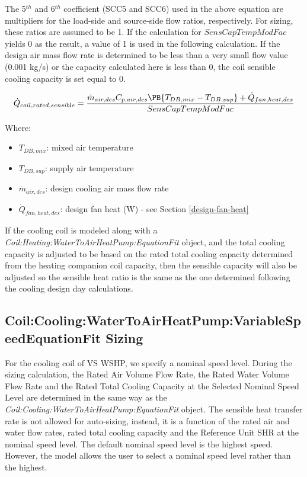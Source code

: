 The 5\(^{th}\) and 6\(^{th}\) coefficient (SCC5 and SCC6) used in the above equation are multipliers for the load-side and source-side flow ratios, respectively. For sizing, these ratios are assumed to be 1. If the calculation for $SensCapTempModFac$ yields 0 as the result, a value of 1 is used in the following calculation. If the design air mass flow rate is determined to be less than a very small flow value (0.001 kg/s) or the capacity calculated here is less than 0, the coil sensible cooling capacity is set equal to 0.

\begin{equation}
  \dot{Q}_{coil,rated,sensible} = \frac{\dot{m}_{air,des}C_{p,air,des}\PB{T_{DB,mix}-T_{DB,sup}}+\dot{Q}_{fan,heat,des}}{SensCapTempModFac}
\end{equation}

Where:

\begin{itemize}
\item \(T_{DB,mix}\): mixed air temperature
\item \(T_{DB,sup}\): supply air temperature
\item \(\dot{m}_{air,des}\): design cooling air mass flow rate
\item \(\dot{Q}_{fan,heat,des}\): design fan heat (W) - see Section \ref{design-fan-heat}
\end{itemize}

If the cooling coil is modeled along with a \emph{Coil:Heating:WaterToAirHeatPump:EquationFit} object, and the total cooling capacity is adjusted to be based on the rated total cooling capacity determined from the heating companion coil capacity, then the sensible capacity will also be adjusted so the sensible heat ratio is the same as the one determined following the cooling design day calculations.

\subsection{Coil:Cooling:WaterToAirHeatPump:VariableSpeedEquationFit Sizing}\label{coilcoolingwatertoairheatpumpvariablespeedequationfit-sizing}

For the cooling coil of VS WSHP, we specify a nominal speed level. During the sizing calculation, the Rated Air Volume Flow Rate, the Rated Water Volume Flow Rate and the Rated Total Cooling Capacity at the Selected Nominal Speed Level are determined in the same way as the \emph{Coil:Cooling:WaterToAirHeatPump:EquationFit} object. The sensible heat transfer rate is not allowed for auto-sizing, instead, it is a function of the rated air and water flow rates, rated total cooling capacity and the Reference Unit SHR at the nominal speed level. The default nominal speed level is the highest speed. However, the model allows the user to select a nominal speed level rather than the highest.

